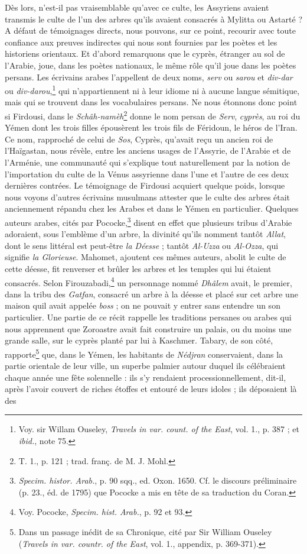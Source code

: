 \documentclass[a4paper, 11pt, oneside, polutonikogreek, french]{article}
\begin{document}
Dès lors, n'est-il pas vraisemblable qu'avec ce culte, les Assyriens avaient transmis le culte de l'un des arbres qu'ils avaient consacrés à Mylitta ou Astarté ? A défaut de témoignages directs, nous pouvons, sur ce point, recourir avec toute confiance aux preuves indirectes qui nous sont fournies par les poètes et les historiens orientaux. Et d'abord remarquons que le cyprès, étranger au sol de l'Arabie, joue, dans les poètes nationaux, le même rôle qu'il joue dans les poètes persans. Les écrivains arabes l'appellent de deux noms, \emph{serv} ou \emph{sarou} et \emph{div-dar} ou \emph{div-darou},\footnote{Voy. sir Willam Ouseley, \emph{Travels in var. count. of the East}, vol. 1., p. 387 ; et \emph{ibid.}, note 75.} qui n'appartiennent ni à leur idiome ni à aucune langue sémitique, mais qui se trouvent dans les vocabulaires persans. Ne nous étonnons donc point si Firdousi, dans le \emph{Schâh-namèh}\footnote{T. 1., p. 121 ; trad. franç. de M. J. Mohl.} donne le nom persan de \emph{Serv}, \emph{cyprès}, au roi du Yémen dont les trois filles épousèrent les trois fils de Féridoun, le héros de l'Iran. Ce nom, rapproché de celui de \emph{Sos}, Cyprès, qu'avait reçu un ancien roi de l'Haïgastan, nous révèle, entre les anciens usages de l'Assyrie, de l'Arabie et de l'Arménie, une communauté qui s'explique tout naturellement par la notion de l'importation du culte de la Vénus assyrienne dans l'une et l'autre de ces deux dernières contrées. Le témoignage de Firdousi acquiert quelque poids, lorsque nous voyons d'autres écrivains musulmans attester que le culte des arbres était anciennement répandu chez les Arabes et dans le Yémen en particulier. Quelques auteurs arabes, cités par Pococke,\footnote{\emph{Specim. histor. Arab.}, p. 90 sqq., ed. Oxon. 1650. Cf. le discours préliminaire (p. 23., éd. de 1795) que Pococke a mis en tête de sa traduction du Coran.} disent en effet que plusieurs tribus d'Arabie adoraient, sous l'emblème d'un arbre, la divinité qu'ils nomment tantôt \emph{Allat}, dont le sens littéral est peut-être \emph{la Déesse} ; tantôt \emph{Al-Uzza} ou \emph{Al-Ozza}, qui signifie \emph{la Glorieuse}. Mahomet, ajoutent ces mêmes auteurs, abolit le culte de cette déesse, fit renverser et brûler les arbres et les temples qui lui étaient consacrés. Selon Firouzabadi,\footnote{Voy. Pococke, \emph{Specim. hist. Arab.}, p. 92 et 93.} un personnage nommé \emph{Dhâlem} avait, le premier, dans la tribu des \emph{Gatfan}, consacré un arbre à la déesse et placé sur cet arbre une maison quil avait appelée \emph{boss} ; on ne pouvait y entrer sans entendre un son particulier. Une partie de ce récit rappelle les traditions persanes ou arabes qui nous apprennent que Zoroastre avait fait construire un palais, ou du moins une grande salle, sur le cyprès planté par lui à Kaschmer. Tabary, de son côté, rapporte\footnote{Dans un passage inédit de sa Chronique, cité par Sir William Ouseley (\emph{Travels in var. countr. of the East}, vol. 1., appendix, p. 369-371).} que, dans le Yémen, les habitants de \emph{Nédjran} conservaient, dans la partie orientale de leur ville, un superbe palmier autour duquel ils célébraient chaque année une fête solennelle : ils s'y rendaient processionnellement, dit-il, après l'avoir couvert de riches étoffes et entouré de leurs idoles ; ils déposaient là des 
\end{document}
